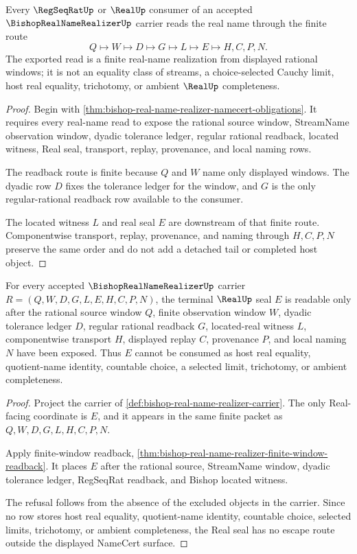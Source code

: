 \begin{theorem}
\label{thm:bishop-real-name-realizer-finite-window-readback}
Every $\RegSeqRatUp$ or $\RealUp$ consumer of an accepted $\BishopRealNameRealizerUp$ carrier reads the real name through the finite route
$$
Q \longmapsto W \longmapsto D \longmapsto G \longmapsto L \longmapsto E \longmapsto H,C,P,N .
$$
The exported read is a finite real-name realization from displayed rational windows; it is not an equality class of streams, a choice-selected Cauchy limit, host real equality, trichotomy, or ambient $\RealUp$ completeness.
\end{theorem}
\begin{proof}
Begin with \autoref{thm:bishop-real-name-realizer-namecert-obligations}. It requires every real-name read to expose the rational source window, StreamName observation window, dyadic tolerance ledger, regular rational readback, located witness, Real seal, transport, replay, provenance, and local naming rows.

The readback route is finite because $Q$ and $W$ name only displayed windows. The dyadic row $D$ fixes the tolerance ledger for the window, and $G$ is the only regular-rational readback row available to the consumer.

The located witness $L$ and real seal $E$ are downstream of that finite route. Componentwise transport, replay, provenance, and naming through $H,C,P,N$ preserve the same order and do not add a detached tail or completed host object.
\end{proof}

\begin{theorem}
\label{thm:bishop-real-name-realizer-real-seal-nonescape}
For every accepted $\BishopRealNameRealizerUp$ carrier $R=(Q,W,D,G,L,E,H,C,P,N)$, the terminal $\RealUp$ seal $E$ is readable only after the rational source window $Q$, finite observation window $W$, dyadic tolerance ledger $D$, regular rational readback $G$, located-real witness $L$, componentwise transport $H$, displayed replay $C$, provenance $P$, and local naming $N$ have been exposed. Thus $E$ cannot be consumed as host real equality, quotient-name identity, countable choice, a selected limit, trichotomy, or ambient completeness.
\end{theorem}
\begin{proof}
Project the carrier of \autoref{def:bishop-real-name-realizer-carrier}. The only Real-facing coordinate is $E$, and it appears in the same finite packet as $Q,W,D,G,L,H,C,P,N$.

Apply finite-window readback, \autoref{thm:bishop-real-name-realizer-finite-window-readback}. It places $E$ after the rational source, StreamName window, dyadic tolerance ledger, RegSeqRat readback, and Bishop located witness.

The refusal follows from the absence of the excluded objects in the carrier. Since no row stores host real equality, quotient-name identity, countable choice, selected limits, trichotomy, or ambient completeness, the Real seal has no escape route outside the displayed NameCert surface.
\end{proof}

